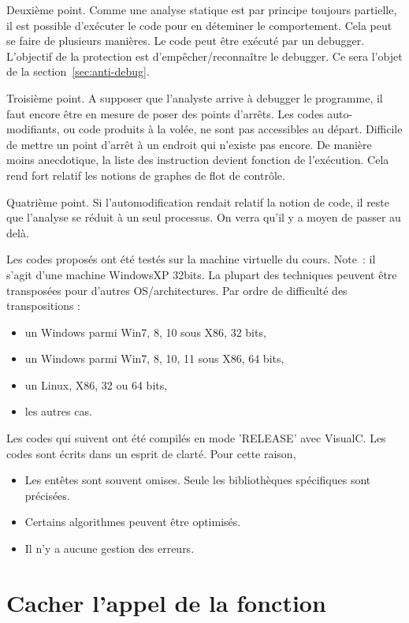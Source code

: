 \documentclass{book}
\begin{document}
Deuxième point. Comme une analyse statique est par principe toujours partielle, il est possible d'exécuter le code pour en déteminer le comportement. Cela peut se faire de plusieurs manières. Le code peut être exécuté par un debugger. L'objectif de la protection est d'empêcher/reconnaître le debugger. Ce sera l'objet de la section~\ref{sec:anti-debug}. 

Troisième point. A supposer que l'analyste arrive à debugger le programme, il faut encore être en mesure de poser des points d'arrêts. Les codes auto-modifiants, ou code produits à la volée, ne sont pas accessibles au départ. Difficile de mettre un point d'arrêt à un endroit qui n'existe pas encore. De manière moins anecdotique, la liste des instruction devient fonction de l'exécution. Cela rend fort relatif les notions de graphes de flot de contrôle. 

Quatrième point. Si l'automodification rendait relatif la notion de code, il reste que l'analyse se réduit à un seul processus. On verra qu'il y a moyen de passer au delà.


Les codes proposés ont été testés sur la machine virtuelle du cours. Note~: il s'agit d'une machine WindowsXP 32bits. La plupart des techniques peuvent être transposées pour d'autres OS/architectures. Par ordre de difficulté des transpositions : 
\begin{itemize}
	\item un Windows parmi Win7, 8, 10 sous X86, 32 bits,
	\item un Windows parmi Win7, 8, 10, 11 sous X86, 64 bits,
	\item un Linux, X86, 32 ou 64 bits,
	\item les autres cas. 
\end{itemize}

Les codes qui suivent ont été compilés en mode 'RELEASE' avec VisualC.  Les codes sont écrits dans un esprit de clarté. Pour cette raison, 
\begin{itemize}
	\item Les entêtes sont souvent omises. Seule les bibliothèques spécifiques sont précisées. 
	\item Certains algorithmes peuvent être optimisés. 
	\item Il n'y a aucune gestion des erreurs. 
\end{itemize}






\section{Cacher l'appel de la fonction}
\end{document}
